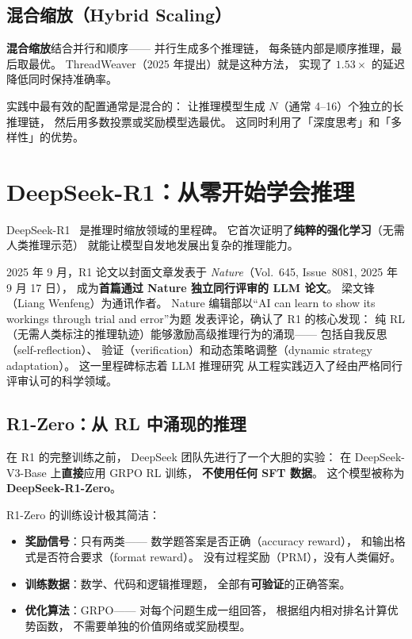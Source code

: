 \subsection{混合缩放（Hybrid Scaling）}

\textbf{混合缩放}结合并行和顺序——
并行生成多个推理链，
每条链内部是顺序推理，最后取最优。
ThreadWeaver（2025 年提出）就是这种方法，
实现了 $1.53\times$ 的延迟降低同时保持准确率。

实践中最有效的配置通常是混合的：
让推理模型生成 $N$（通常 4--16）个独立的长推理链，
然后用多数投票或奖励模型选最优。
这同时利用了「深度思考」和「多样性」的优势。


\section{DeepSeek-R1：从零开始学会推理}

DeepSeek-R1~\cite{deepseekr1} 是推理时缩放领域的里程碑。
它首次证明了\textbf{纯粹的强化学习}（无需人类推理示范）
就能让模型自发地发展出复杂的推理能力。

2025 年 9 月，R1 论文以封面文章发表于
\textit{Nature}（Vol.~645, Issue~8081, 2025 年 9 月 17 日），
成为\textbf{首篇通过 Nature 独立同行评审的 LLM 论文}。
梁文锋（Liang Wenfeng）为通讯作者。
Nature 编辑部以``AI can learn to show its workings through trial and error''为题
发表评论，确认了 R1 的核心发现：
纯 RL（无需人类标注的推理轨迹）能够激励高级推理行为的涌现——
包括自我反思（self-reflection）、
验证（verification）和动态策略调整（dynamic strategy adaptation）。
这一里程碑标志着 LLM 推理研究
从工程实践迈入了经由严格同行评审认可的科学领域。

\subsection{R1-Zero：从 RL 中涌现的推理}

在 R1 的完整训练之前，
DeepSeek 团队先进行了一个大胆的实验：
在 DeepSeek-V3-Base 上\textbf{直接}应用 GRPO RL 训练，
\textbf{不使用任何 SFT 数据}。
这个模型被称为 \textbf{DeepSeek-R1-Zero}。

R1-Zero 的训练设计极其简洁：
\begin{itemize}[noitemsep]
  \item \textbf{奖励信号}：只有两类——
        数学题答案是否正确（accuracy reward），
        和输出格式是否符合要求（format reward）。
        没有过程奖励（PRM），没有人类偏好。
  \item \textbf{训练数据}：数学、代码和逻辑推理题，
        全部有\textbf{可验证}的正确答案。
  \item \textbf{优化算法}：GRPO——
        对每个问题生成一组回答，
        根据组内相对排名计算优势函数，
        不需要单独的价值网络或奖励模型。
\end{itemize}

